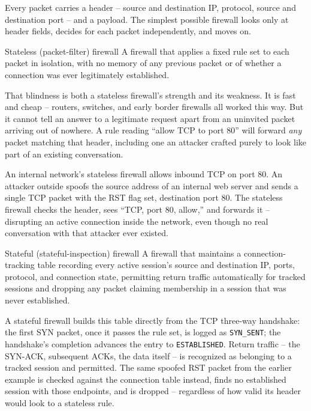 Every packet carries a header -- source and destination IP, protocol, source and destination port
-- and a payload. The simplest possible firewall looks only at header fields, decides for each
packet independently, and moves on.

\begin{definition}{Stateless (packet-filter) firewall}
A firewall that applies a fixed rule set to each packet in isolation, with no memory of any
previous packet or of whether a connection was ever legitimately established.
\end{definition}

That blindness is both a stateless firewall's strength and its weakness. It is fast and cheap --
routers, switches, and early border firewalls all worked this way. But it cannot tell an answer to
a legitimate request apart from an uninvited packet arriving out of nowhere. A rule reading ``allow
TCP to port 80'' will forward \emph{any} packet matching that header, including one an attacker
crafted purely to look like part of an existing conversation.

\begin{example}
An internal network's stateless firewall allows inbound TCP on port 80. An attacker outside spoofs
the source address of an internal web server and sends a single TCP packet with the RST flag set,
destination port 80. The stateless firewall checks the header, sees ``TCP, port 80, allow,'' and
forwards it -- disrupting an active connection inside the network, even though no real conversation
with that attacker ever existed.
\end{example}

\begin{definition}{Stateful (stateful-inspection) firewall}
A firewall that maintains a connection-tracking table recording every active session's source and
destination IP, ports, protocol, and connection state, permitting return traffic automatically for
tracked sessions and dropping any packet claiming membership in a session that was never
established.
\end{definition}

A stateful firewall builds this table directly from the TCP three-way handshake: the first SYN
packet, once it passes the rule set, is logged as \texttt{SYN\_SENT}; the handshake's completion
advances the entry to \texttt{ESTABLISHED}. Return traffic -- the SYN-ACK, subsequent ACKs, the
data itself -- is recognized as belonging to a tracked session and permitted. The same spoofed RST
packet from the earlier example is checked against the connection table instead, finds no
established session with those endpoints, and is dropped -- regardless of how valid its header
would look to a stateless rule.

